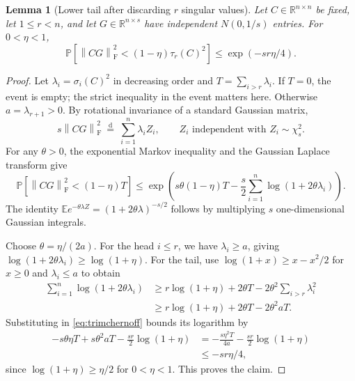 \documentclass[11pt]{article}
\numberwithin{equation}{section}
\newtheorem{lemma}[theorem]{Lemma}
\theoremstyle{remark}
\newcommand{\R}{\mathbb R}
\newcommand{\E}{\mathbb E}
\newcommand{\Prob}{\mathbb P}
\newcommand{\norm}[1]{\left\lVert #1\right\rVert_{\mathrm F}}
\begin{document}
\begin{lemma}[Lower tail after discarding $r$ singular values]\label{lem:trimmed}
Let $C\in\R^{n\times n}$ be fixed, let $1\le r<n$, and let $G\in\R^{n\times s}$ have independent $N(0,1/s)$ entries. For $0<\eta<1$,
\begin{equation}\label{eq:trimmed}
 \Prob\!\left[\norm{CG}^2<(1-\eta)\tau_r(C)^2\right]
 \le \exp(-sr\eta/4).
\end{equation}
\end{lemma}
\begin{proof}
Let $\lambda_i=\sigma_i(C)^2$ in decreasing order and
$T=\sum_{i>r}\lambda_i$. If $T=0$, the event is empty; the strict inequality in the event matters here. Otherwise $a=\lambda_{r+1}>0$.
By rotational invariance of a standard Gaussian matrix,
\[
 s\norm{CG}^2\ \stackrel{\mathrm d}=\ \sum_{i=1}^n\lambda_i Z_i,
 \qquad Z_i\text{ independent with }Z_i\sim\chi_s^2.
\]
For any $\theta>0$, the exponential Markov inequality and the Gaussian Laplace transform give
\begin{equation}\label{eq:trimchernoff}
 \Prob\!\left[\norm{CG}^2<(1-\eta)T\right]
 \le\exp\!\left(s\theta(1-\eta)T
       -\frac{s}{2}\sum_{i=1}^n\log(1+2\theta\lambda_i)\right).
\end{equation}
The identity $\E e^{-\theta\lambda Z}=(1+2\theta\lambda)^{-s/2}$ follows by multiplying $s$ one-dimensional Gaussian integrals.

Choose $\theta=\eta/(2a)$. For the head $i\le r$, we have $\lambda_i\ge a$, giving $\log(1+2\theta\lambda_i)\ge\log(1+\eta)$. For the tail, use $\log(1+x)\ge x-x^2/2$ for $x\ge0$ and $\lambda_i\le a$ to obtain
\begin{align*}
 \sum_{i=1}^n\log(1+2\theta\lambda_i)
 &\ge r\log(1+\eta)+2\theta T-2\theta^2\sum_{i>r}\lambda_i^2\\
 &\ge r\log(1+\eta)+2\theta T-2\theta^2aT.
\end{align*}
Substituting in \eqref{eq:trimchernoff} bounds its logarithm by
\begin{align*}
 -s\theta\eta T+s\theta^2aT-\frac{sr}{2}\log(1+\eta)
 &=-\frac{s\eta^2T}{4a}-\frac{sr}{2}\log(1+\eta)\\
 &\le -sr\eta/4,
\end{align*}
since $\log(1+\eta)\ge\eta/2$ for $0<\eta<1$. This proves the claim.
\end{proof}
\end{document}
